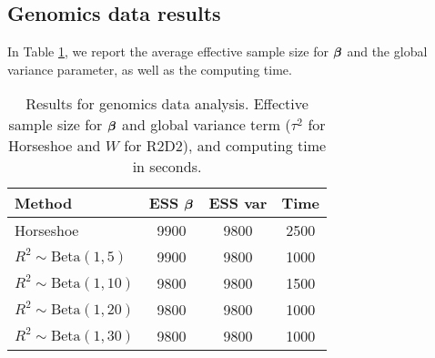 \documentclass[12pt]{article}
\begin{document}
\subsection{Genomics data results}
In Table \ref{tab:gen}, we report the average effective sample size for $\mbox{\boldmath $\beta$}$ and the global variance parameter, as well as the computing time.


\begin{table}[h]
    \centering
    \begin{tabular}{l|ccc}
        Method & ESS $\mbox{\boldmath $\beta$}$ & ESS var & Time  \\\hline
        Horseshoe & 9900 & 9800 & 2500 \\
        $R^2\sim\mbox{Beta}(1,5)$ & 9900 & 9800 & 1000  \\
        $R^2\sim\mbox{Beta}(1,10)$& 9800 & 9800 & 1500 \\
        $R^2\sim\mbox{Beta}(1,20)$& 9800 & 9800 & 1000\\
        $R^2\sim\mbox{Beta}(1,30)$& 9800 & 9800 & 1000
    \end{tabular}
    \caption{Results for genomics data analysis. Effective sample size for $\mbox{\boldmath $\beta$}$ and global variance term ($\tau^2$ for Horseshoe and $W$ for R2D2), and computing time in seconds.}
    \label{tab:gen}
\end{table}
\end{document}
